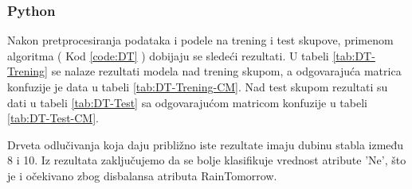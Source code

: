 \documentclass[a4paper]{article}
\begin{document}
\subsubsection{Python}
\label{subsubsec:python}
Nakon pretprocesiranja podataka i podele na trening i test skupove, primenom algoritma ( Kod \ref{code:DT} ) dobijaju se sledeći rezultati.
U tabeli \ref{tab:DT-Trening} se nalaze rezultati modela nad trening skupom, a odgovarajuća matrica konfuzije je data u tabeli \ref{tab:DT-Trening-CM}. Nad test skupom rezultati su dati u tabeli \ref{tab:DT-Test} sa odgovarajućom matricom konfuzije u tabeli \ref{tab:DT-Test-CM}.\par
Drveta odlučivanja koja daju približno iste rezultate imaju dubinu stabla između 8 i 10. Iz rezultata zaključujemo da se bolje klasifikuje vrednost atribute 'Ne', što je i očekivano zbog disbalansa atributa RainTomorrow.\par
\newpage
\label{code:DT}

\end{document}
